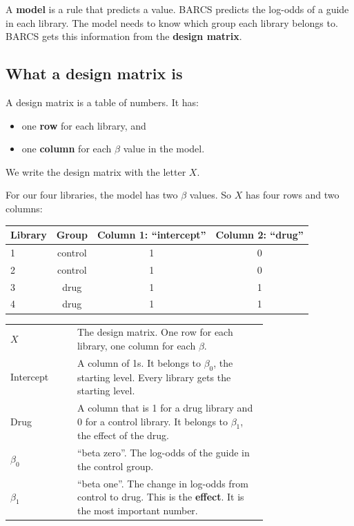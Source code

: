 A \textbf{model} is a rule that predicts a value. BARCS predicts the
log-odds of a guide in each library. The model needs to know which group
each library belongs to. BARCS gets this information from the
\textbf{design matrix}.

\subsection{What a design matrix is}

A design matrix is a table of numbers. It has:
\begin{itemize}
\item one \textbf{row} for each library, and
\item one \textbf{column} for each $\beta$ value in the model.
\end{itemize}
We write the design matrix with the letter $X$.

For our four libraries, the model has two $\beta$ values. So $X$ has four
rows and two columns:

\begin{center}
\begin{tabular}{lc|cc}
\toprule
Library & Group & Column 1: ``intercept'' & Column 2: ``drug''\\
\midrule
1 & control & 1 & 0\\
2 & control & 1 & 0\\
3 & drug    & 1 & 1\\
4 & drug    & 1 & 1\\
\bottomrule
\end{tabular}
\end{center}

\begin{symbols}
\begin{tabular}{@{}l p{0.74\linewidth}@{}}
$X$ & The design matrix. One row for each library, one column for each
      $\beta$.\\
Intercept & A column of 1s. It belongs to $\beta_0$, the starting level.
      Every library gets the starting level.\\
Drug & A column that is 1 for a drug library and 0 for a control library.
      It belongs to $\beta_1$, the effect of the drug.\\
$\beta_0$ & ``beta zero''. The log-odds of the guide in the control group.\\
$\beta_1$ & ``beta one''. The change in log-odds from control to drug. This
      is the \textbf{effect}. It is the most important number.\\
\end{tabular}
\end{symbols}

